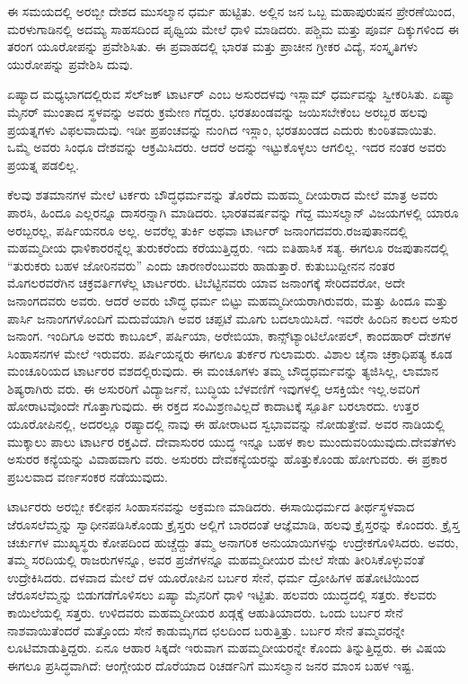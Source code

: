 ಈ ಸಮಯದಲ್ಲಿ ಅರಬ್ಬೀ ದೇಶದ ಮುಸಲ್ಮಾನ ಧರ್ಮ ಹುಟ್ಟಿತು. ಅಲ್ಲಿನ ಜನ ಒಬ್ಬ ಮಹಾಪುರುಷನ ಪ್ರೇರಣೆಯಿಂದ, ಮರಳುಗಾಡಿನಲ್ಲಿ ಅದಮ್ಯ ಸಾಹಸದಿಂದ ಪೃಥ್ವಿಯ ಮೇಲೆ ಧಾಳಿ ಮಾಡಿದರು. ಪಶ್ಚಿಮ ಮತ್ತು ಪೂರ್ವ ದಿಕ್ಕುಗಳಿಂದ ಈ ತರಂಗ ಯೂರೋಪನ್ನು ಪ್ರವೇಶಿಸಿತು. ಈ ಪ್ರವಾಹದಲ್ಲಿ ಭಾರತ ಮತ್ತು ಪ್ರಾಚೀನ ಗ್ರೀಕರ ವಿದ್ಯೆ, ಸಂಸ್ಕೃತಿಗಳು ಯುರೋಪನ್ನು ಪ್ರವೇಶಿಸಿ ದುವು.

ಏಷ್ಯಾದ ಮಧ್ಯಭಾಗದಲ್ಲಿರುವ ಸೆಲ್​ಜಕ್​ ಟಾರ್ಟರ್​ ಎಂಬ ಅಸುರದಳವು ಇಸ್ಲಾಮ್​ ಧರ್ಮವನ್ನು ಸ್ವೀಕರಿಸಿತು. ಏಷ್ಯಾ ಮೈನರ್​ ಮುಂತಾದ ಸ್ಥಳವನ್ನು ಅವರು ಕ್ರಮೇಣ ಗೆದ್ದರು. ಭರತಖಂಡವನ್ನು ಜಯಿಸಬೇಕೆಂಬ ಅರಬ್ಬರ ಹಲವು ಪ್ರಯತ್ನಗಳು ವಿಫಲವಾದುವು. ಇಡೀ ಪ್ರಪಂಚವನ್ನು ನುಂಗಿದ ಇಸ್ಲಾಂ, ಭರತಖಂಡದ ಎದುರು ಕುಂಠಿತವಾಯಿತು. ಒಮ್ಮೆ ಅವರು ಸಿಂಧೂ ದೇಶವನ್ನು ಆಕ್ರಮಿಸಿದರು. ಆದರೆ ಅದನ್ನು ಇಟ್ಟುಕೊಳ್ಳಲು ಆಗಲಿಲ್ಲ. ಇದರ ನಂತರ ಅವರು ಪ್ರಯತ್ನ ಪಡಲಿಲ್ಲ.

ಕೆಲವು ಶತಮಾನಗಳ ಮೇಲೆ ಟರ್ಕರು ಬೌದ್ಧಧರ್ಮವನ್ನು ತೊರೆದು ಮಹಮ್ಮ ದೀಯರಾದ ಮೇಲೆ ಮಾತ್ರ ಅವರು ಪಾರಸಿ, ಹಿಂದೂ ಎಲ್ಲರನ್ನೂ ದಾಸರನ್ನಾಗಿ ಮಾಡಿದರು. ಭಾರತವರ್ಷವನ್ನು ಗೆದ್ದ ಮುಸಲ್ಮಾನ್​ ವಿಜಯಗಳಲ್ಲಿ ಯಾರೂ ಅರಬ್ಬರಲ್ಲ, ಪರ್ಷಿಯನರೂ ಅಲ್ಲ. ಅವರೆಲ್ಲ ತುರ್ಕಿ ಅಥವಾ ಟಾರ್ಟರ್​ ಜನಾಂಗದವರು.ರಜಪುತಾನದಲ್ಲಿ ಮಹಮ್ಮದೀಯ ಧಾಳಿಕಾರರನ್ನೆಲ್ಲ ತುರುಕರೆಂದು ಕರೆಯುತ್ತಿದ್ದರು. ಇದು ಐತಿಹಾಸಿಕ ಸತ್ಯ. ಈಗಲೂ ರಜಪುತಾನದಲ್ಲಿ “ತುರುಕರು ಬಹಳ ಜೋರಿನವರು” ಎಂದು ಚಾರಣರೆಂಬುವರು ಹಾಡುತ್ತಾರೆ. ಕುತುಬುದ್ದೀನನ ನಂತರ ಮೊಗಲರವರೆಗಿನ ಚಕ್ರವರ್ತಿಗಳೆಲ್ಲ ಟಾರ್ಟರರು. ಟಿಬೆಟ್ಟಿನವರು ಯಾವ ಜನಾಂಗಕ್ಕೆ ಸೇರಿದವರೋ, ಅದೇ ಜನಾಂಗದವರು ಅವರು. ಆದರೆ ಅವರು ಬೌದ್ಧ ಧರ್ಮ ಬಿಟ್ಟು ಮಹಮ್ಮದೀಯರಾಗಿರುವರು, ಮತ್ತು ಹಿಂದೂ ಮತ್ತು ಪಾರ್ಸಿ ಜನಾಂಗಗಳೊಂದಿಗೆ ಮದುವೆಯಾಗಿ ಅವರ ಚಪ್ಪಟೆ ಮೂಗು ಬದಲಾಯಿಸಿದೆ. ಇವರೇ ಹಿಂದಿನ ಕಾಲದ ಅಸುರ ಜನಾಂಗ. ಇಂದಿಗೂ ಅವರು ಕಾಬೂಲ್​, ಪರ್ಷಿಯಾ, ಅರೇಬಿಯಾ, ಕಾನ್ಸ್​ಟ್ಯಾಂಟಿಲೋಪಲ್​, ಕಾಂದಹಾರ್​ ದೇಶಗಳ ಸಿಂಹಾಸನಗಳ ಮೇಲೆ ಇರುವರು. ಪರ್ಷಿಯನ್ನರು ಈಗಲೂ ತುರ್ಕರ ಗುಲಾಮರು. ವಿಶಾಲ ಚೈನಾ ಚಕ್ರಾಧಿಪತ್ಯ ಕೂಡ ಮಂಚೂರಿಯದ ಟಾರ್ಟರರ ವಶದಲ್ಲಿರುವುದು. ಈ ಮಂಚೂಗಳು ತಮ್ಮ ಬೌದ್ಧಧರ್ಮವನ್ನು ತ್ಯಜಿಸಿಲ್ಲ, ಲಾಮಾನ ಶಿಷ್ಯರಾಗಿರು ವರು. ಈ ಅಸುರರಿಗೆ ವಿದ್ಯಾರ್ಜನೆ, ಬುದ್ಧಿಯ ಬೆಳವಣಿಗೆ ಇವುಗಳಲ್ಲಿ ಆಸಕ್ತಿಯೇ ಇಲ್ಲ.ಅವರಿಗೆ ಹೋರಾಟವೊಂದೇ ಗೊತ್ತಾಗುವುದು. ಈ ರಕ್ತದ ಸಂಮಿಶ್ರಣವಿಲ್ಲದೆ ಕಾದಾಟಕ್ಕೆ ಸ್ಪೂರ್ತಿ ಬರಲಾರದು. ಉತ್ತರ ಯೂರೋಪಿನಲ್ಲಿ, ಅದರಲ್ಲೂ ರಷ್ಯಾದಲ್ಲಿ ನಾವು ಈ ಹೋರಾಟದ ಸ್ವಭಾವವನ್ನು ನೋಡುತ್ತೇವೆ. ಅವರ ನಾಡಿಯಲ್ಲಿ ಮುಕ್ಕಾಲು ಪಾಲು ಟಾರ್ಟರ ರಕ್ತವಿದೆ. ದೇವಾಸುರರ ಯುದ್ಧ ಇನ್ನೂ ಬಹಳ ಕಾಲ ಮುಂದುವರಿಯುವುದು.ದೇವತೆಗಳು ಅಸುರರ ಕನ್ಯೆಯನ್ನು ವಿವಾಹವಾಗು ವರು. ಅಸುರರು ದೇವಕನ್ಯೆಯರನ್ನು ಹೊತ್ತುಕೊಂಡು ಹೋಗುವರು. ಈ ಪ್ರಕಾರ ಪ್ರಬಲವಾದ ವರ್ಣಸಂಕರ ನಡೆಯುವುದು.

ಟಾರ್ಟರರು ಅರಬ್ಬೀ ಕಲೀಫನ ಸಿಂಹಾಸನವನ್ನು ಅಕ್ರಮಣ ಮಾಡಿದರು. ಈಸಾಯಿಧರ್ಮದ ತೀರ್ಥಸ್ಥಳವಾದ ಜೆರೂಸಲೆಮ್ಮನ್ನು ಸ್ವಾಧೀನಪಡಿಸಿಕೊಂಡು ಕ್ರೈಸ್ತರು ಅಲ್ಲಿಗೆ ಬಾರದಂತೆ ಆಜ್ಞೆಮಾಡಿ, ಹಲವು ಕ್ರೈಸ್ತರನ್ನು ಕೊಂದರು. ಕ್ರೈಸ್ತ ಚರ್ಚುಗಳ ಮುಖ್ಯಸ್ಥರು ಕೋಪದಿಂದ ಹುಚ್ಚೆದ್ದು ತಮ್ಮ ಅನಾಗರಿಕ ಅನುಯಾಯಿಗಳನ್ನು ಉದ್ರೇಕಗೊಳಿಸಿದರು. ಅವರು, ತಮ್ಮ ಸರದಿಯಲ್ಲಿ ರಾಜರುಗಳನ್ನೂ, ಅವರ ಪ್ರಜೆಗಳನ್ನೂ ಮಹಮ್ಮದೀಯರ ಮೇಲೆ ಸೇಡು ತೀರಿಸಿಕೊಳ್ಳುವಂತೆ ಉದ್ರೇಕಿಸಿದರು. ದಳವಾದ ಮೇಲೆ ದಳ ಯೂರೋಪಿನ ಬರ್ಬರ ಸೇನೆ, ಧರ್ಮ ದ್ರೋಹಿಗಳ ಹತೋಟಿಯಿಂದ ಜೆರೂಸಲೆಮ್ಮನ್ನು ಬಿಡುಗಡೆಗೊಳಿಸಲು ಏಷ್ಯಾ ಮೈನರಿಗೆ ಧಾಳಿ ಇಟ್ಟಿತು. ಹಲವರು ಯುದ್ಧದಲ್ಲಿ ಸತ್ತರು. ಕೆಲವರು ಕಾಯಿಲೆಯಲ್ಲಿ ಸತ್ತರು. ಉಳಿದವರು ಮಹಮ್ಮದೀಯರ ಖಡ್ಗಕ್ಕೆ ಆಹುತಿಯಾದರು. ಒಂದು ಬರ್ಬರ ಸೇನೆ ನಾಶವಾಯಿತೆಂದರೆ ಮತ್ತೊಂದು ಸೇನೆ ಕಾಡುಮೃಗದ ಛಲದಿಂದ ಬರುತ್ತಿತ್ತು. ಬರ್ಬರ ಸೇನೆ ತಮ್ಮವರನ್ನೇ ಲೂಟಿಮಾಡುತ್ತಿದ್ದರು. ಏನೂ ಆಹಾರ ಸಿಕ್ಕದೇ ಇರುವಾಗ ಮಹಮ್ಮದೀಯರನ್ನೇ ಕೊಂದು ತಿನ್ನುತ್ತಿದ್ದರು. ಈ ವಿಷಯ ಈಗಲೂ ಪ್ರಸಿದ್ಧವಾಗಿದೆ: ಆಂಗ್ಲೇಯರ ದೊರೆಯಾದ ರಿಚರ್ಡನಿಗೆ ಮುಸಲ್ಮಾನ ಜನರ ಮಾಂಸ ಬಹಳ ಇಷ್ಟ.

